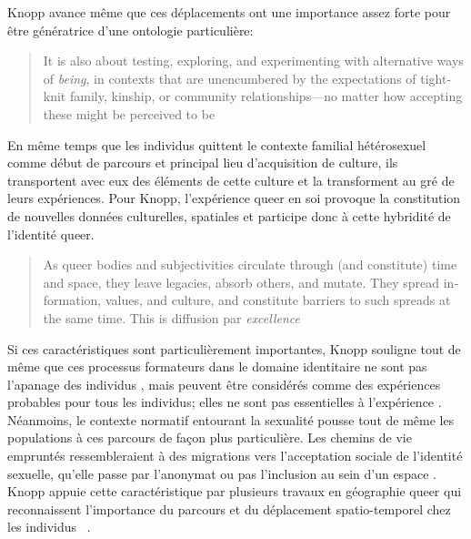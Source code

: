 Knopp avance même que ces déplacements ont une importance assez forte pour être génératrice d'une ontologie particulière:
\foreignblockquote{english}[{\cite[123]{Knopp2004}}][.]{It is also about testing, exploring, and experimenting with alternative ways of \emph{being}, in contexts that are unencumbered by the expectations of tight-knit family, kinship, or community relationships—no matter how accepting these might be perceived to be}
En même temps que les individus \lgbt{} quittent le contexte familial hétérosexuel comme début de parcours et principal lieu d'acquisition de culture, ils transportent avec eux des éléments de cette culture et la transforment au gré de leurs expériences.
Pour Knopp, l'expérience queer en soi provoque la constitution de nouvelles données culturelles, spatiales et participe donc à cette hybridité de l'identité queer.
\foreignblockquote{english}[{\cite[130]{Knopp2004}}][.]{As queer bodies and subjectivities circulate through (and constitute) time and space, they leave legacies, absorb others, and mutate. They spread information, values, and culture, and constitute barriers to such spreads at the same time. This is diffusion par \emph{excellence}}

Si ces caractéristiques sont particulièrement importantes, Knopp souligne tout de même que ces processus formateurs dans le domaine identitaire ne sont pas l'apanage des individus \lgbt{}, mais peuvent être considérés comme des expériences probables pour tous les individus; elles ne sont pas essentielles à l'expérience \lgbt{}.
Néanmoins, le contexte normatif entourant la sexualité pousse tout de même les populations \lgbt{} à ces parcours de façon plus particulière.
Les chemins de vie empruntés ressembleraient à des migrations vers l'acceptation sociale de l'identité sexuelle, qu'elle passe par l'anonymat ou pas l'inclusion au sein d'un espace \lgbt{}.
Knopp appuie cette caractéristique par plusieurs travaux en géographie queer qui reconnaissent l'importance du parcours et du déplacement spatio-temporel chez les individus \lgbt{}~\citep[123]{Knopp2004}.



